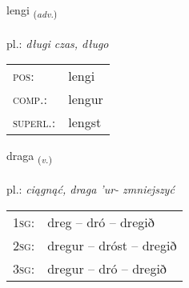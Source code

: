 \documentclass[frontgrid, backgrid]{flacards}\usepackage[]{graphicx}\usepackage[]{xcolor}
\begin{document}
\renewcommand{\blhead}{\vskip5pt {\small\bfseries\footnotesize Atviksorð | Adverb }}
\renewcommand{\bcfoot}{\vskip5pt \hspace{2pt}{\small\bfseries\footnotesize 1K}}


{lengi \small{\textsubscript{(\textit{adv.})}} \\[1ex] %
\textphonetic{[leiɲcɪ]} \\
pl.: \emph{długi czas, długo} \\  [2ex]
\renewcommand*{\arraystretch}{0.8}
\begin{tabular}{ll}
\textsc{pos}: & lengi \\ 
\textsc{comp.}: & lengur \\ 
\textsc{superl.}: & lengst \\
\end{tabular}
}

\renewcommand{\flhead}{\vskip5pt \fboxsep=0pt {\small\bfseries\footnotesize Sagnorð | Verb}}
\renewcommand{\fcfoot}{\vskip5pt \fboxsep=0pt \hspace{2pt}{\small\bfseries\footnotesize 1K}}

\renewcommand{\blhead}{\vskip5pt {\small\bfseries\footnotesize Sagnorð | Verb }}
\renewcommand{\bcfoot}{\vskip5pt \hspace{2pt}{\small\bfseries\footnotesize 1K}}


{draga \small{\textsubscript{(\textit{v.})}} \\[1ex] %
\textphonetic{[traːɣa]} \\
pl.: \emph{ciągnąć, draga 'ur- zmniejszyć} \\  [2ex]
\renewcommand*{\arraystretch}{0.8}
\begin{tabular}{p{1cm}l}
\textsc{1sg}: & dreg -- dró -- dregið \\ 
\textsc{2sg}: & dregur -- dróst -- dregið \\ 
\textsc{3sg}: & dregur -- dró -- dregið \\ 
\end{tabular}
}

\renewcommand{\flhead}{\vskip5pt \fboxsep=0pt {\small\bfseries\footnotesize Nafnorð | Noun}}
\renewcommand{\fcfoot}{\vskip5pt \fboxsep=0pt \hspace{2pt}{\small\bfseries\footnotesize 1K}}
\end{document}
